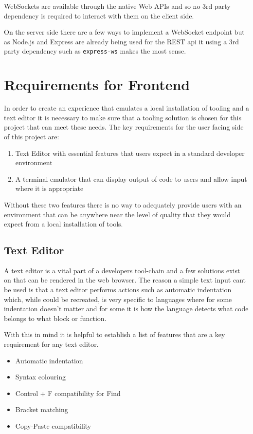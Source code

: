 WebSockets are available through the native Web APIs and so no 3rd party dependency is required to interact with them on the client side.

On the server side there are a few ways to implement a WebSocket endpoint but as Node.js and Express are already being used for the REST api it using a 3rd party dependency such as \texttt{express-ws} makes the most sense.

\section{Requirements for Frontend}

In order to create an experience that emulates a local installation of tooling and a text editor it is necessary to make sure that a tooling solution is chosen for this project that can meet these needs. The key requirements for the user facing side of this project are:

\begin{enumerate}
    \item Text Editor with essential features that users expect in a standard developer environment
    \item A terminal emulator that can display output of code to users and allow input where it is appropriate
\end{enumerate}

Without these two features there is no way to adequately provide users with an environment that can be anywhere near the level of quality that they would expect from a local installation of tools.

\subsection{Text Editor}

A text editor is a vital part of a developers tool-chain and a few solutions exist on that can be rendered in the web browser. The reason a simple text input cant be used is that a text editor performs actions such as automatic indentation which, while could be recreated, is very specific to languages where for some indentation doesn't matter and for some it is how the language detects what code belongs to what block or function.

With this in mind it is helpful to establish a list of features that are a key requirement for any text editor.

\begin{itemize}
    \item Automatic indentation
    \item Syntax colouring 
    \item Control + F compatibility for Find
    \item Bracket matching
    \item Copy-Paste compatibility
\end{itemize}


